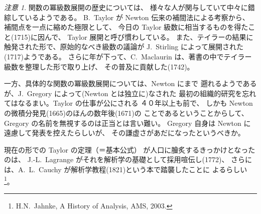 \documentclass[a4paper]{jsarticle}
\theoremstyle{definition}
\theoremstyle{remark}
\newtheorem{Remark}{注意}
\begin{document}
\begin{Remark}
{\small
関数の冪級数展開の歴史については、
様々な人が関与していて中々に錯綜しているようである。
B.~Taylor が Newton 伝来の補間法による考察から、
補間点を一点に縮めた極限として、
今日の Taylor 級数に相当するものを得たこと(1715)に因んで、
Taylor 展開と呼び慣わしている。
また、テイラーの結果に触発された形で、原始的なべき級数の議論が
J.~Stirling によって展開された(1717)ようである。
さらに年が下って、C.~Maclaurin は、著書の中でテイラー級数を整理した形で取り上げ、
その普及に貢献した(1742)。

一方、具体的な関数の冪級数展開については、Newton にまで
遡れるようであるが、J.~Gregory によって(Newton とは独立に)なされた
最初の組織的研究を忘れてはなるまい。Taylor の仕事が公にされる
４０年以上も前で、
しかも Newton の微積分発見(1665)のほんの数年後(1671)の
ことであるということからして、
Gregory の名前を無視するのは正当とは言い難い。
Gregory 自身は Newton に遠慮して発表を控えたらしいが、
その謙虚さがあだになったというべきか。

現在の形での Taylor の定理（＝基本公式）
が人口に膾炙するきっかけとなったのは、
J.-L.~Lagrange がそれを解析学の基礎として採用喧伝し(1772)、
さらには、A.~L.~Cauchy が解析学教程(1821)という本で踏襲したことに
よるらしい\footnote{
H.N.~Jahnke, A History of Analysis, AMS, 2003.
}。


}
\end{Remark}
\end{document}
